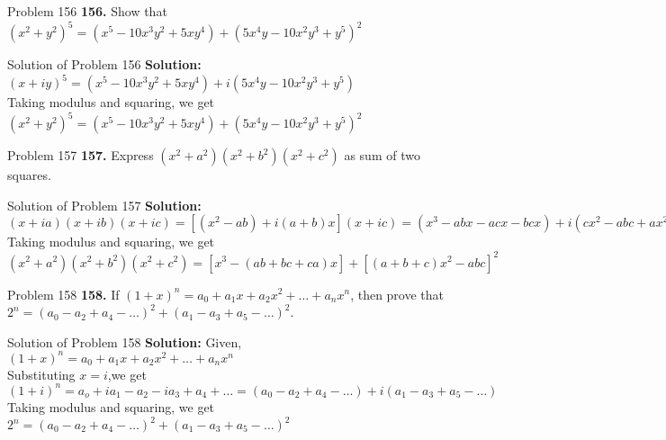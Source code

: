 \documentclass[aspectratio=169,8pt]{beamer}
\begin{document}
\begin{frame}{Problem 156}
  \textbf{156.} Show that $(x^2 + y^2)^5 = (x^5 - 10x^3y^2 + 5xy^4) + (5x^4y - 10x^2y^3 + y^5)^2$
\end{frame}
\begin{frame}{Solution of Problem 156}
  \textbf{Solution:} $(x + iy)^5 = (x^5 - 10x^3y^2 + 5xy^4) + i(5x^4y - 10x^2y^3 + y^5)$\\
  \vspace*{0.2cm}
  Taking modulus and squaring, we get\\
  \vspace*{0.2cm}
  $(x^2 + y^2)^5 = (x^5 - 10x^3y^2 + 5xy^4) + (5x^4y - 10x^2y^3 + y^5)^2$
\end{frame}
\begin{frame}{Problem 157}
  \textbf{157.} Express $(x^2+a^2)(x^2+b^2)(x^2+c^2)$ as sum of two squares.
\end{frame}
\begin{frame}{Solution of Problem 157}
  \textbf{Solution:} $(x + ia)(x + ib)(x + ic) = [(x^2 - ab) + i(a + b)x](x + ic) = (x^3 - abx - acx - bcx) + i(cx^2 - abc + ax^2 +
  bx^2)$\\
  \vspace*{0.2cm}
  Taking modulus and squaring, we get\\
  \vspace*{0.2cm}
  $(x^2 + a^2)(x^2 + b^2)(x^2 + c^2) = [x^3 -(ab + bc + ca)x] + [(a + b + c)x^2 - abc]^2$
\end{frame}
\begin{frame}{Problem 158}
  \textbf{158.} If $(1 + x)^n = a_0 + a_1x + a_2x^2 + \ldots + a_nx^n$, then prove that $2^n = (a_0 - a_2 + a_4 - \ldots)^2 + (a_1
  - a_3 + a_5 - \ldots)^2$.
\end{frame}
\begin{frame}{Solution of Problem 158}
  \textbf{Solution:} Given, $(1 + x)^n = a_0 + a_1x + a_2x^2 + \ldots + a_nx^n$\\
  \vspace*{0.2cm}
  Substituting $x = i$,we get\\
  \vspace*{0.2cm}
  $(1 + i)^n = a_o + ia_1 - a_2 - ia_3 + a_4 + \ldots = (a_0 - a_2 + a_4 - \ldots) + i(a_1 - a_3 + a_5 - \ldots)$\\
  \vspace*{0.2cm}
  Taking modulus and squaring, we get\\
  \vspace*{0.2cm}
  $2^n = (a_0 - a_2 + a_4 - \ldots)^2 + (a_1 - a_3 + a_5 - \ldots)^2$
\end{frame}
\end{document}
